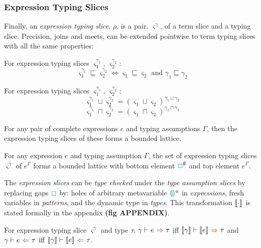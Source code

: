 \subsubsection{Expression Typing Slices}
Finally, an \textit{expression typing slice}, $\rho$, is a pair, $\varsigma^\gamma$, of a term slice and a typing slice. Precision, joins and meets, can be extended pointwise to term typing slices with all the same properties:
\begin{definition}
For expression typing slices $\varsigma_1^{\gamma_1}$, $\varsigma_2^{\gamma_2}$:
\[\varsigma_1^{\gamma_1} \sqsubseteq \varsigma_2^{\gamma_2} \iff  \varsigma_1 \sqsubseteq \varsigma_2 \text{ and } \gamma_1 \sqsubseteq \gamma_2\]
\end{definition}
\begin{definition}
For expression typing slices $\varsigma_1^{\gamma_1}$, $\varsigma_2^{\gamma_2}$:
\[\varsigma_1^{\gamma_1} \sqcup \varsigma_2^{\gamma_2} = (\varsigma_1 \sqcup \varsigma_2)^{\gamma_1 \sqcup \gamma_2}\]
\[\varsigma_1^{\gamma_1} \sqcap \varsigma_2^{\gamma_2} = (\varsigma_1 \sqcap \varsigma_2)^{\gamma_1 \sqcap \gamma_2}\]
\end{definition}

For any pair of complete expressions $e$ and typing assumptions $\Gamma$, then the expression typing slices of these forms a bounded lattice.

\begin{proposition}
For any expression $e$ and typing assumption $\Gamma$, the set of expression typing slices $\varsigma^{\gamma}$ of $e^{\Gamma}$ forms a bounded lattice with bottom element ${\color{teal}\Box}^{\emptyset}$ and top element $e^{\Gamma}$.
\end{proposition}

The \textit{expression slices} can be \textit{type checked} under the \textit{type assumption slices} by replacing gaps ${\color{teal}\Box}$ by: holes of arbitrary metavariable ${\color{teal}\llparenthesis}  {\color{teal}\rrparenthesis}^u$ in \textit{expressions}, fresh variables in \textit{patterns}, and the dynamic type in \textit{types}. This transformation $\llbracket \cdot \rrbracket$ is stated formally in the appendix \textbf{(fig APPENDIX)}.

\begin{definition}
For expression typing slice $\varsigma^{\gamma}$ and type $\tau$. $\synthesis[\gamma]{e}{\tau}$ iff $\synthesis[\type{\gamma}]{\type{e}}{\tau}$ and $\analysis[\gamma]{e}{\tau}$ iff $\analysis[\type{\gamma}]{\type{e}}{\tau}$.
\end{definition}
